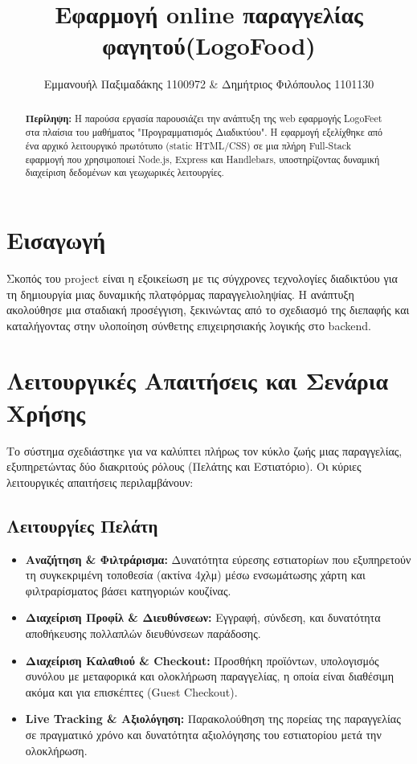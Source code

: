 \documentclass[acmsmall,screen,nonacm]{acmart}
\title{Εφαρμογή online παραγγελίας φαγητού(LogoFood)}
\author{Εμμανουήλ Παξιμαδάκης 1100972 \& Δημήτριος Φιλόπουλος 1101130}
\affiliation{
	\institution{\newline Τμήμα ΗΜ\&ΤΥ, Πανεπιστήμιο Πατρών}
	\country{Ελλάδα}
}
\begin{document}
	
	\begin{abstract}
		\textbf{Περίληψη:} Η παρούσα εργασία παρουσιάζει την ανάπτυξη της web εφαρμογής LogoFeet στα πλαίσια του μαθήματος "Προγραμματισμός Διαδικτύου". Η εφαρμογή εξελίχθηκε από ένα αρχικό λειτουργικό πρωτότυπο (static HTML/CSS) σε μια πλήρη Full-Stack εφαρμογή που χρησιμοποιεί Node.js, Express και Handlebars, υποστηρίζοντας δυναμική διαχείριση δεδομένων και γεωχωρικές λειτουργίες.
	\end{abstract}
	
	\maketitle
	
	\section{Εισαγωγή}
	Σκοπός του project είναι η εξοικείωση με τις σύγχρονες τεχνολογίες διαδικτύου για τη δημιουργία μιας δυναμικής πλατφόρμας παραγγελιοληψίας. Η ανάπτυξη ακολούθησε μια σταδιακή προσέγγιση, ξεκινώντας από το σχεδιασμό της διεπαφής και καταλήγοντας στην υλοποίηση σύνθετης επιχειρησιακής λογικής στο backend.
	
	\section{Λειτουργικές Απαιτήσεις και Σενάρια Χρήσης}
	Το σύστημα σχεδιάστηκε για να καλύπτει πλήρως τον κύκλο ζωής μιας παραγγελίας, εξυπηρετώντας δύο διακριτούς ρόλους (Πελάτης και Εστιατόριο). Οι κύριες λειτουργικές απαιτήσεις περιλαμβάνουν:

	\subsection{Λειτουργίες Πελάτη}
	\begin{itemize}
		\item \textbf{Αναζήτηση \& Φιλτράρισμα:} Δυνατότητα εύρεσης εστιατορίων που εξυπηρετούν τη συγκεκριμένη τοποθεσία (ακτίνα 4χλμ) μέσω ενσωμάτωσης χάρτη και φιλτραρίσματος βάσει κατηγοριών κουζίνας.
		\item \textbf{Διαχείριση Προφίλ \& Διευθύνσεων:} Εγγραφή, σύνδεση, και δυνατότητα αποθήκευσης πολλαπλών διευθύνσεων παράδοσης.
		\item \textbf{Διαχείριση Καλαθιού \& Checkout:} Προσθήκη προϊόντων, υπολογισμός συνόλου με μεταφορικά και ολοκλήρωση παραγγελίας, η οποία είναι διαθέσιμη ακόμα και για επισκέπτες (Guest Checkout).
		\item \textbf{Live Tracking \& Αξιολόγηση:} Παρακολούθηση της πορείας της παραγγελίας σε πραγματικό χρόνο και δυνατότητα αξιολόγησης του εστιατορίου μετά την ολοκλήρωση.
	\end{itemize}
\end{document}
